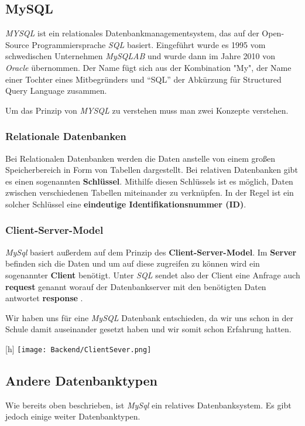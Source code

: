 \subsection{MySQL}

\textit{MYSQL} ist ein relationales Datenbankmanagementsystem, das auf der Open-Source
Programmiersprache \textit{SQL} basiert. Eingeführt wurde es 1995 vom schwedischen Unternehmen
\textit{MySQLAB} und wurde dann im Jahre 2010 von \textit{Oracle} übernommen. Der Name fügt sich
aus der Kombination "My", der Name einer Tochter eines Mitbegründers und ``SQL'' der Abkürzung
für Structured Query Language zusammen.

Um das Prinzip von \textit{MYSQL} zu verstehen muss man zwei Konzepte verstehen.

\subsubsection{Relationale Datenbanken}
Bei Relationalen Datenbanken werden die Daten anstelle von
einem großen Speicherbereich in Form von Tabellen dargestellt.
Bei relativen Datenbanken gibt es einen sogenannten \textbf{Schlüssel}. Mithilfe diesen Schlüssels
ist es möglich, Daten zwischen verschiedenen Tabellen miteinander zu verknüpfen. In der Regel ist
ein solcher Schlüssel eine \textbf{eindeutige Identifikationsnummer (ID)}.
\subsubsection{Client-Server-Model}
\textit{MySql} basiert außerdem auf dem Prinzip des \textbf{Client-Server-Model}. Im \textbf{Server}
befinden sich die Daten und um auf diese zugreifen zu können wird ein sogenannter \textbf{Client}
benötigt. Unter \textit{SQL} sendet also der Client eine Anfrage auch \textbf{request} genannt
worauf der Datenbankserver mit den benötigten Daten antwortet \textbf{response} .

Wir haben uns für eine \textit{MySQL} Datenbank entschieden, da wir uns schon in der Schule
damit auseinander gesetzt haben und wir somit schon Erfahrung hatten.

\begin{center}[h]
    \texttt{[image: Backend/ClientSever.png]}
\end{center}



\subsection{Andere Datenbanktypen}
Wie bereits oben beschrieben, ist \textit{MySql} ein relatives Datenbanksystem. Es gibt
jedoch einige weiter Datenbanktypen.

